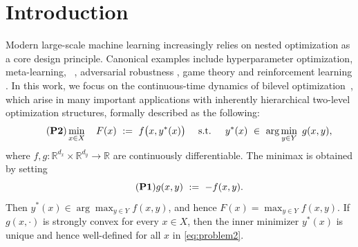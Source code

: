 \documentclass{article}
\newcommand{\1}{\mathbf{1}}
\begin{document}
\section{Introduction}
Modern large-scale machine learning increasingly relies on nested optimization as a core design principle. Canonical examples include hyperparameter optimization, meta-learning, ~\cite{maclaurin2015gradient,domke2012generic,pedregosa2016hyperparameter,franceschi2018bilevel,shaban2019truncated}, adversarial robustness \cite{goodfellow2020generative}, game theory \cite{stackelberg1952theory} and reinforcement learning \cite{konda1999actor, sutton2018reinforcement}. In this work, we focus on the continuous-time dynamics of bilevel optimization~\cite{colson2007overview}, which arise in many important applications with inherently hierarchical two-level optimization structures, formally described as the following:
\begin{equation}\label{eq:problem2}
\tag{\textbf{P2}}
\min_{x\in X}\quad  F(x)\ :=\ f\bigl(x,y^{*}(x)\bigr) 
\quad \text{ s.t. }\quad  y^{*}(x)\ \in\ \arg\min_{y\in Y}\ g(x,y),
\end{equation}
where $f,g:\mathbb{R}^{d_x}\times\mathbb{R}^{d_y}\to\mathbb{R}$ are continuously differentiable. The minimax   is obtained by setting
\begin{equation}\label{eq:P1}
\tag{\textbf{P1}}
g(x,y)\ :=\ -f(x,y).
\end{equation}
Then $y^{*}(x)\in\arg\max_{y\in Y}f(x,y)$, and hence $F(x) = \max_{y\in Y}f(x,y).$ If $g(x,\cdot)$ is strongly convex for every $x\in X$, then the inner minimizer $y^{*}(x)$ is unique and hence well-defined for all $x$ in \ref{eq:problem2}. 
\end{document}

